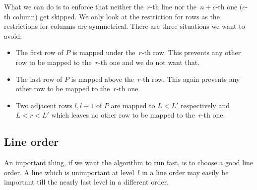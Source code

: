 What we can do is to enforce that neither the~$r$-th line nor the~$n+c$-th one ($c$-th column) get skipped. We only look at the restriction for rows as the restrictions for columns are symmetrical. There are three situations we want to avoid:
\begin{itemize}
\item The first row of $P$ is mapped under the~$r$-th row. This prevents any other row to be mapped to the~$r$-th one and we do not want that.
\item The last row of $P$ is mapped above the~$r$-th row. This again prevents any other row to be mapped to the~$r$-th one.
\item Two adjacent rows $l,l+1$ of $P$ are mapped to $L<L'$ respectively and $L<r<L'$ which leaves no other row to be mapped to the~$r$-th one.
\end{itemize}

\subsection{Line order}
\label{sect:order}
An important thing, if we want the algorithm to run fast, is to choose a good line order. A line which is unimportant at level~$l$ in a line order may easily be important till the nearly last level in a different order.

